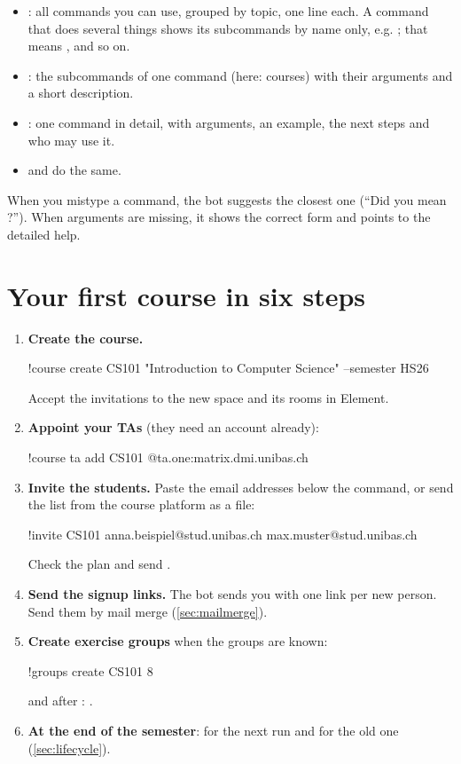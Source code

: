 \begin{itemize}
  \item {}: all commands you can use, grouped by topic, one line each. A command
        that does several things shows its subcommands by name only, e.g.
        ; that means ,
         and so on.
  \item {}: the subcommands of one command (here: courses) with their
        arguments and a short description.
  \item {}: one command in detail, with arguments, an example, the
        next steps and who may use it.
  \item {} and  do the same.
\end{itemize}

When you mistype a command, the bot suggests the closest one (\enquote{Did you mean
?}). When arguments are missing, it shows the correct form and points to
the detailed help.

\section{Your first course in six steps}
\label{sec:quickstart}

\begin{enumerate}
  \item \textbf{Create the course.}
\begin{you}
!course create CS101 "Introduction to Computer Science" --semester HS26
\end{you}
        Accept the invitations to the new space and its rooms in Element.
  \item \textbf{Appoint your TAs} (they need an account already):
\begin{you}
!course ta add CS101 @ta.one:matrix.dmi.unibas.ch
\end{you}
  \item \textbf{Invite the students.} Paste the email addresses below the command, or send
        the list from the course platform as a file:
\begin{you}
!invite CS101
anna.beispiel@stud.unibas.ch
max.muster@stud.unibas.ch
\end{you}
        Check the plan and send .
  \item \textbf{Send the signup links.} The bot sends you  with one
        link per new person. Send them by mail merge (\autoref{sec:mailmerge}).
  \item \textbf{Create exercise groups} when the groups are known:
\begin{you}
!groups create CS101 8
\end{you}
        and after : .
  \item \textbf{At the end of the semester}:  for the next
        run and  for the old one (\autoref{sec:lifecycle}).
\end{enumerate}
